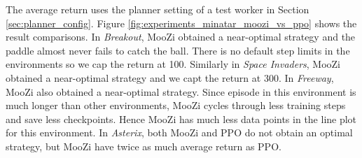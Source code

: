 The average return uses the planner setting of a test worker in Section \ref{sec:planner_config}.
Figure \ref{fig:experiments_minatar_moozi_vs_ppo} shows the result comparisons.
In \textit{Breakout}, MooZi obtained a near-optimal strategy and the paddle almost never fails to catch the ball.
There is no default step limits in the environments so we cap the return at 100.
Similarly in \textit{Space Invaders}, MooZi obtained a near-optimal strategy and we capt the return at 300.
In \textit{Freeway}, MooZi also obtained a near-optimal strategy.
Since episode in this environment is much longer than other environments, MooZi cycles through less training steps and save less checkpoints.
Hence MooZi has much less data points in the line plot for this environment.
In \textit{Asterix}, both MooZi and PPO do not obtain an optimal strategy, but MooZi have twice as much average return as PPO.


